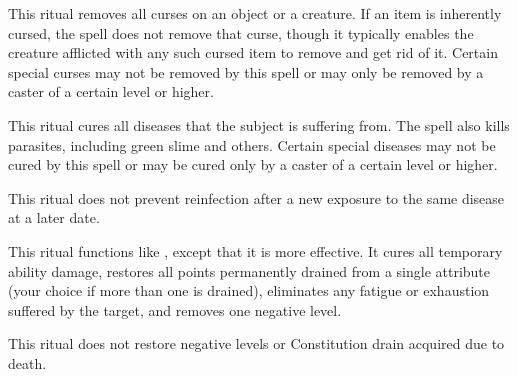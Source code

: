\begin{spelleffect}
This ritual removes all curses on an object or a creature. If an item is inherently cursed, the spell does not remove that curse, though it typically enables the creature afflicted with any such cursed item to remove and get rid of it. Certain special curses may not be removed by this spell or may only be removed by a caster of a certain level or higher.
\end{spelleffect}

\begin{spelleffect}
This ritual cures all diseases that the subject is suffering from. The spell also kills parasites, including green slime and others. Certain special diseases may not be cured by this spell or may be cured only by a caster of a certain level or higher.
\end{spelleffect}
\begin{spellnotes}
This ritual does not prevent reinfection after a new exposure to the same disease at a later date.
\end{spellnotes}

\begin{spelleffect}
This ritual functions like , except that it is more effective. It cures all temporary ability damage, restores all points permanently drained from a single attribute (your choice if more than one is drained), eliminates any fatigue or exhaustion suffered by the target, and removes one negative level.
\end{spelleffect}
\begin{spellnotes}
This ritual does not restore negative levels or Constitution drain acquired due to death.
\end{spellnotes}

